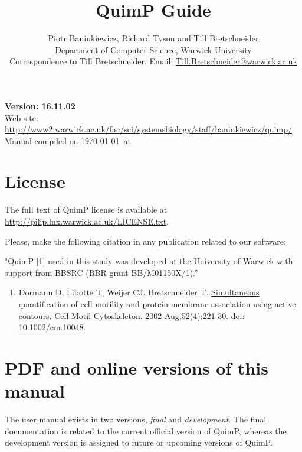 \documentclass[a4paper,12pt]{article}
\begin{document}
\title{QuimP Guide}
\author{Piotr Baniukiewicz, Richard Tyson and Till Bretschneider\\ \small Department of Computer Science, Warwick University\\ \small Correspondence to Till Bretschneider. Email: \href{mailto:Till.Bretschneider@warwick.ac.uk}{Till.Bretschneider@warwick.ac.uk}\\}
\date{}
\maketitle
\begin{center}
\textbf{{\large Version: 16.11.02}}\\
\vspace{1cm}
Web site: \url{http://www2.warwick.ac.uk/fac/sci/systemsbiology/staff/baniukiewicz/quimp/}
\vfill
{\footnotesize Manual compiled on \today\  at \currenttime}
\end{center}

\tableofcontents

\setlength{\parskip}{10pt}
\setlength{\parindent}{0pt}

\section{License}
The full text of QuimP license is available at \href{http://pilip.lnx.warwick.ac.uk/LICENSE.txt}{http://pilip.lnx.warwick.ac.uk/LICENSE.txt}.

Please, make the following citation in any publication related to our software:

"QuimP [1] used in this study was developed at the University of Warwick with support from BBSRC (BBR grant BB/M01150X/1).”
\begin{enumerate}
\item Dormann D, Libotte T, Weijer CJ, Bretschneider T. \href{https://www.ncbi.nlm.nih.gov/pubmed/12112136}{Simultaneous quantification of cell motility and protein-membrane-association using active contours}. Cell Motil Cytoskeleton. 2002 Aug;52(4):221-30. \href{http://dx.doi.org/10.1007/978-3-0348-8043-5_17}{doi: 10.1002/cm.10048}.
\end{enumerate}

\section{PDF and online versions of this manual}
The user manual exists in two versions, \textit{final} and \textit{development}. The final documentation is related to the current official version of QuimP, whereas the development version is assigned to future or upcoming versions of QuimP.
\end{document}
